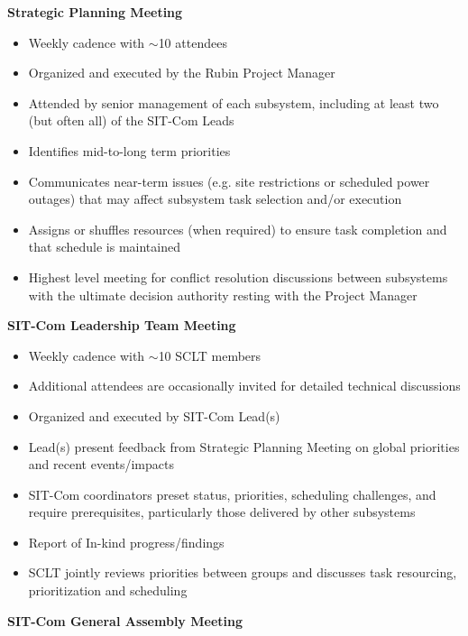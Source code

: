 \documentclass[SE,lsstdraft,authoryear,toc]{lsstdoc, lsstdraft}
\begin{document}
\textbf{Strategic Planning Meeting}

\begin{itemize}
    \item Weekly cadence with $\sim$10 attendees
    \item Organized and executed by the Rubin Project Manager
    \item Attended by senior management of each subsystem, including at least two (but often all) of the SIT-Com Leads
    \item Identifies mid-to-long term priorities
    \item Communicates near-term issues (e.g. site restrictions or scheduled power outages) that may affect subsystem task selection and/or execution
    \item Assigns or shuffles resources (when required) to ensure task completion and that schedule is maintained
    \item Highest level meeting for conflict resolution discussions between subsystems with the ultimate decision authority resting with the Project Manager
\end{itemize}

\textbf{SIT-Com Leadership Team Meeting}

\begin{itemize}
    \item Weekly cadence with $\sim$10 SCLT members
    \item Additional attendees are occasionally invited for detailed technical discussions
    \item Organized and executed by SIT-Com Lead(s)
    \item Lead(s) present feedback from Strategic Planning Meeting on global priorities and recent events/impacts
    \item SIT-Com coordinators preset status, priorities, scheduling challenges, and require prerequisites, particularly those delivered by other subsystems
    \item Report of In-kind progress/findings
    \item SCLT jointly reviews priorities between groups and discusses task resourcing, prioritization and scheduling
\end{itemize}


\textbf{SIT-Com General Assembly Meeting}
\end{document}
